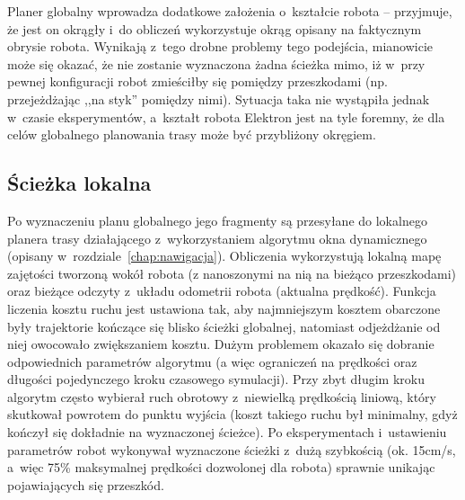 Planer globalny wprowadza dodatkowe założenia o~kształcie robota -- przyjmuje, że
jest on okrągły i~do obliczeń wykorzystuje okrąg opisany na faktycznym obrysie robota.
Wynikają z~tego drobne problemy tego podejścia, mianowicie może się okazać, że nie
zostanie wyznaczona żadna ścieżka mimo, iż w~przy pewnej konfiguracji robot zmieściłby
się pomiędzy przeszkodami (np. przejeżdżając ,,na styk'' pomiędzy nimi). Sytuacja
taka nie wystąpiła jednak w~czasie eksperymentów, a~kształt robota Elektron jest
na tyle foremny, że dla celów globalnego planowania trasy może być przybliżony okręgiem.

\subsection{Ścieżka lokalna}

Po wyznaczeniu planu globalnego jego fragmenty są przesyłane do lokalnego planera
trasy działającego z~wykorzystaniem algorytmu okna dynamicznego (opisany
w~rozdziale~\ref{chap:nawigacja}). Obliczenia wykorzystują lokalną mapę zajętości
tworzoną wokół robota (z nanoszonymi na nią na bieżąco przeszkodami) oraz
bieżące odczyty z~układu odometrii robota (aktualna prędkość).
Funkcja liczenia kosztu ruchu jest ustawiona tak,
aby najmniejszym kosztem obarczone były trajektorie kończące się blisko ścieżki globalnej,
natomiast odjeżdżanie od niej owocowało zwiększaniem kosztu. Dużym problemem okazało
się dobranie odpowiednich parametrów algorytmu (a więc ograniczeń na prędkości
oraz długości pojedynczego kroku czasowego symulacji). Przy zbyt długim kroku
algorytm często wybierał ruch obrotowy z~niewielką prędkością liniową, który skutkował
powrotem do punktu wyjścia (koszt takiego ruchu był minimalny, gdyż kończył się dokładnie
na wyznaczonej ścieżce). Po eksperymentach i~ustawieniu parametrów robot wykonywał
wyznaczone ścieżki z~dużą szybkością (ok. 15cm/s, a~więc 75\% maksymalnej prędkości
dozwolonej dla robota) sprawnie unikając pojawiających się przeszkód.
